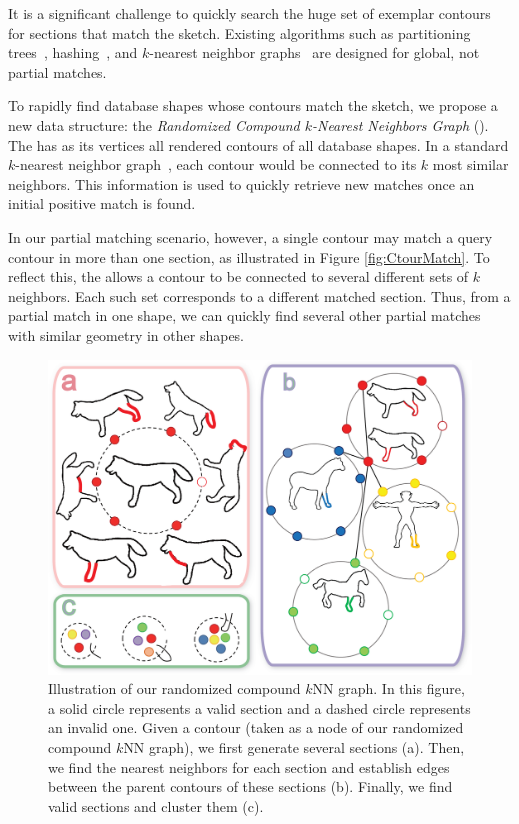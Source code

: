 It is a significant challenge to quickly search the huge set of exemplar contours for sections that match the sketch. Existing algorithms such as partitioning trees~\cite{scalablenearestmujapami2014}, hashing~\cite{nearoptimalandoniacm2008}, and $k$-nearest neighbor graphs~\cite{scalableknnjingwangcvpr2012} are designed for global, not partial matches.

To rapidly find database shapes whose contours match the sketch, we propose a new data structure: the {\em Randomized Compound $k$-Nearest Neighbors Graph} ({\RCKNNG}). The {\RCKNNG} has as its vertices all rendered contours of all database shapes. In a standard $k$-nearest neighbor graph~\cite{scalableknnjingwangcvpr2012}, each contour would be connected to its $k$ most similar neighbors. This information is used to quickly retrieve new matches once an initial positive match is found.

In our partial matching scenario, however, a single contour may match a query contour in more than one section, as illustrated in Figure \ref{fig:CtourMatch}. To reflect this, the {\RCKNNG} allows a contour to be connected to several different sets of $k$ neighbors. Each such set corresponds to a different matched section. Thus, from a partial match in one shape, we can quickly find several other partial matches with similar geometry in other shapes.

\begin{figure}[t]\centering
\includegraphics[width=1.0\linewidth]{./Material/KNN.pdf}
\caption{Illustration of our randomized compound $k$NN graph. In this figure, a solid circle represents a valid section and a dashed circle represents an invalid one. Given a contour (taken as a node of our randomized compound $k$NN graph), we first generate several sections (a). Then, we find the nearest neighbors for each section and establish edges between the parent contours of these sections (b). Finally, we find valid sections and cluster them (c).}\label{fig:KNN}
\end{figure}

